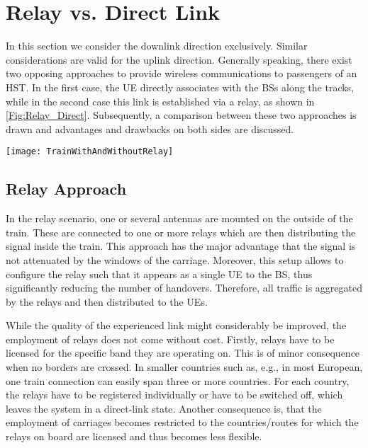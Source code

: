 \documentclass[a4paper,conference,twocolumn,10pt]{IEEEtran}
\begin{document}
\section{Relay vs. Direct Link }
\label{Sec:Relay_vs_Direct}

In this section we consider the downlink direction exclusively. Similar considerations are valid for the uplink direction.
Generally speaking, there exist two opposing approaches to provide wireless communications to passengers of an \ac{HST}. In the first case, the UE directly associates with the \acp{BS} along the tracks, while in the second case this link is established via a relay, as shown in \cref{Fig:Relay_Direct}. Subsequently, a comparison between these two approaches is drawn and advantages and drawbacks on both sides are discussed.

\begin{figure*}
	\centering
\texttt{[image: TrainWithAndWithoutRelay]}	
	\caption{Signal reception with relay- and direct-link approach. Zoomed view indicates possibilities for applying electro-magnetic apertures.}
	\label{Fig:Relay_Direct}
\end{figure*}

\subsection{Relay Approach}
In the relay scenario, one or several antennas are mounted on the outside of the train. These are connected to one or more relays which are then distributing the signal inside the train. This approach has the major advantage that the signal is not attenuated by the windows of the carriage. Moreover, this setup allows to configure the relay such that it appears as a single \ac{UE} to the \ac{BS}, thus significantly reducing the number of handovers. Therefore, all traffic is aggregated by the relays and then distributed to the \acp{UE}.

While the quality of the experienced link might considerably be improved, the employment of relays does not come without cost. Firstly, relays have to be licensed for the specific band they are operating on. This is of minor consequence when no borders are crossed. In smaller countries such as, e.g., in most European, one train connection can easily span three or more countries. For each country, the relays have to be registered individually or have to be switched off, which leaves the system in a direct-link state. Another consequence is, that the employment of carriages becomes restricted to the countries/routes for which the relays on board are licensed and thus becomes less flexible.
\end{document}
